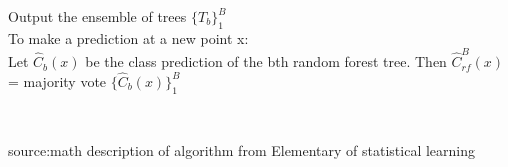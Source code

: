 \documentclass[xcolor={x11names,svgnames,dvipsnames}]{beamer}
\begin{document}
\begin{frame}
\begin{columns}
\begin{column}{.5\textwidth}
{\begin{algorithm}[H]
{{				         		    }				         		    
				         		    }
				         		    \nl Output the ensemble of trees $\{T_b\}_1^B$ \\
				         		    To make a prediction at a new point x:\\
				         		    \nl Let $\hat{C}_b(x)$ be the class prediction of the bth random forest tree. Then $\hat{C}_{rf}^B(x)$= majority vote $\{\hat{C}_b(x)\}_1^{B}$
			\end{algorithm} \\
				         		   }
		
	    \small{\alert{source:math description of algorithm from Elementary of statistical learning}}\\
	    
	\end{column}
\end{columns}	
\end{frame}

\end{document}
